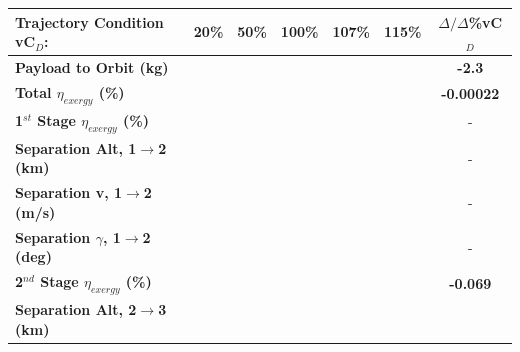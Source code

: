 \begin{table}[ht]
	\centering
	\begin{tabular}{l c c c c c c} 
		\hline \textbf{Trajectory Condition} \qquad vC$_D$:
		&20\%
		&50\%
		&100\%
		&107\%
		&115\%
		& $\Delta/\Delta$\%vC$_D$
		\\
		\hline \textbf{Payload to Orbit (kg)}
		& \textbf{\PayloadToOrbitvCdTwenty}
		& \textbf{\PayloadToOrbitvCdFifty}
		& \textbf{\PayloadToOrbitvCdStandard}
		& \textbf{\PayloadToOrbitvCdOneHundredSeven}
		& \textbf{\PayloadToOrbitvCdOneHundredFifteen}
		&\textbf{-2.3}
		\\
		\textbf{Total $\eta_{exergy}$ (\%)}
		& \textbf{\totalExergyEffvCdTwenty}
		& \textbf{\totalExergyEffvCdFifty}
		& \textbf{\totalExergyEffvCdStandard}
		& \textbf{\totalExergyEffvCdOneHundredSeven}
		& \textbf{\totalExergyEffvCdOneHundredFifteen}
		& \textbf{-0.00022}
		\\
		\hline 
		\textbf{1$^{st}$ Stage $\eta_{exergy}$ (\%)}
		& \textbf{\firstExergyEffvCdTwenty}
		& \textbf{\firstExergyEffvCdFifty}
		& \textbf{\firstExergyEffvCdStandard}
		& \textbf{\firstExergyEffvCdOneHundredSeven}
		& \textbf{\firstExergyEffvCdOneHundredFifteen}
		& -
		\\
		\textbf{Separation Alt, 1$\rightarrow$2 (km)}
		& \firstsecondSeparationAltvCdTwenty
		& \firstsecondSeparationAltvCdFifty
		& \firstsecondSeparationAltvCdStandard
		& \firstsecondSeparationAltvCdOneHundredSeven
		& \firstsecondSeparationAltvCdOneHundredFifteen
		& -
		\\
		\textbf{Separation v, 1$\rightarrow$2 (m/s)}
		& \firstsecondSeparationvvCdTwenty
		& \firstsecondSeparationvvCdFifty
		& \firstsecondSeparationvvCdStandard
		& \firstsecondSeparationvvCdOneHundredSeven
		& \firstsecondSeparationvvCdOneHundredFifteen
		& -
		\\
		\textbf{Separation $\gamma$, 1$\rightarrow$2 (deg)}
		& \firstsecondSeparationgammavCdTwenty
		& \firstsecondSeparationgammavCdFifty
		& \firstsecondSeparationgammavCdStandard
		& \firstsecondSeparationgammavCdOneHundredSeven
		& \firstsecondSeparationgammavCdOneHundredFifteen
		& -
		\\
		\hline 
		\textbf{2$^{nd}$ Stage $\eta_{exergy}$ (\%)}
		& \textbf{\secondExergyEffvCdTwenty}
		& \textbf{\secondExergyEffvCdFifty}
		& \textbf{\secondExergyEffvCdStandard}
		& \textbf{\secondExergyEffvCdOneHundredSeven}
		& \textbf{\secondExergyEffvCdOneHundredFifteen}
		& \textbf{-0.069}
		\\
		\textbf{Separation Alt, 2$\rightarrow$3 (km)}
		& \secondthirdSeparationAltvCdTwenty

\end{tabular}
\end{table}
